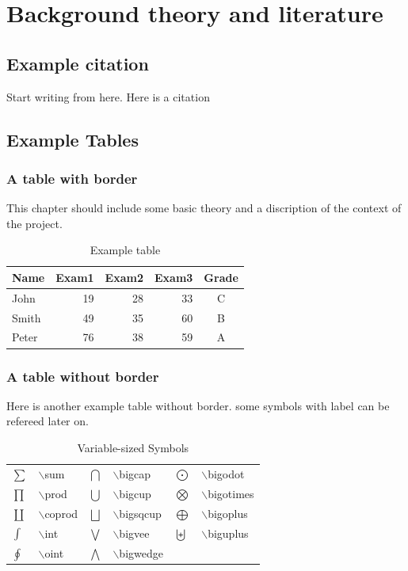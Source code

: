 \chapter{Background theory and literature}
\section{Example citation}
Start writing from here. Here is a citation~\cite{Knuth92}
\section{Example Tables}
\subsection{A table with border} 
This chapter should include some basic theory and a discription of the context of the project. 

\begin{table}[!h]
\caption{Example table}
\begin{center}
\begin{tabular}{| l || r | r | r | c |}
\hline
Name&Exam1&Exam2&Exam3&Grade\\
\hline\hline
John&19& 28&33&C \\
\hline
Smith&49& 35&60&B  \\
\hline
Peter&76& 38&59&A  \\
\hline
\end{tabular}
\end{center}
\end{table}
\subsection{A table without border}
Here is another example table without border. some symbols with
label can be refereed later on.
\begin{table}[!h]
\caption{Variable-sized  Symbols}
\begin{center}
\begin{tabular}{l l l l l l}
$\sum$  \label{p1}&$\backslash$sum   &$\bigcap$ \label{p2}&$\backslash$bigcap      &$\bigodot$   &$\backslash$bigodot  \\
$\prod$ &$\backslash$prod  &$\bigcup$   &$\backslash$bigcup    &$\bigotimes$ &$\backslash$bigotimes\\
$\coprod$ &$\backslash$coprod &$\bigsqcup$ &$\backslash$bigsqcup  &$\bigoplus$ &$\backslash$bigoplus \\
$\int$     &$\backslash$int   &$\bigvee$   &$\backslash$bigvee    &$\biguplus$ &$\backslash$biguplus\\
$\oint$     &$\backslash$oint &$\bigwedge$ &$\backslash$bigwedge
\end{tabular}
\end{center}
\end{table}
